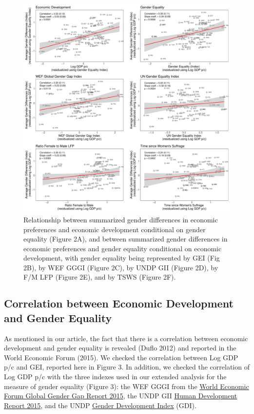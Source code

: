 \documentclass[
]{article}
\begin{document}
\begin{figure}
\centering
\includegraphics{figures/replication/main_Fig2.pdf}
\caption{Relationship between summarized gender differences in economic
preferences and economic development conditional on gender equality
(Figure 2A), and between summarized gender differences in economic
preferences and gender equality conditional on economic development,
with gender equality being represented by GEI (Fig 2B), by WEF GGGI
(Figure 2C), by UNDP GII (Figure 2D), by F/M LFP (Figure 2E), and by
TSWS (Figure 2F).}
\end{figure}

\hypertarget{correlation-between-economic-development-and-gender-equality}{%
\subsection{Correlation between Economic Development and Gender
Equality}\label{correlation-between-economic-development-and-gender-equality}}

As mentioned in our article, the fact that there is a correlation
between economic development and gender equality is revealed (Duflo
2012) and reported in the World Economic Forum (2015). We checked the
correlation between Log GDP p/c and GEI, reported here in Figure 3. In
addition, we checked the correlation of Log GDP p/c with the three
indexes used in our extended analysis for the measure of gender equality
(Figure 3): the WEF GGGI from the
\href{http://reports.weforum.org/}{World Economic Forum Global Gender
Gap Report 2015}, the UNDP GII
\href{http://hdr.undp.org/sites/default/files/hdr_2016_statistical_annex.pdf}{Human
Development Report 2015}, and the UNDP
\href{http://hdr.undp.org/en/indicators/137906}{Gender Development
Index} (GDI).
\end{document}
